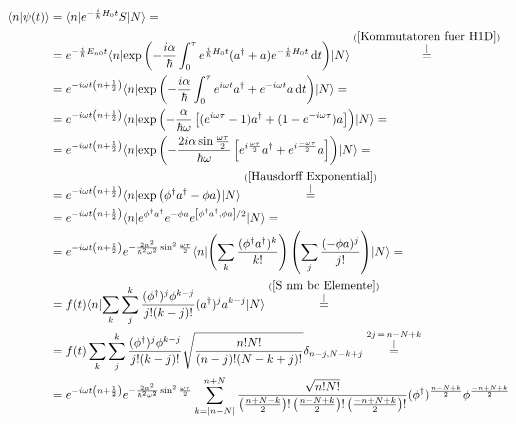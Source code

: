 \documentclass[a4paper,12pt]{article}
\newcommand{\kom}{}
\newcommand{\brak}{}
\newcommand{\braket}{}
\newcommand{\intx}{}
\newcommand{\kla}{}
\newcommand{\klam}{}
\begin{document}
\begin{align*}
\brak\langle {n}| {\psi(t)}\rangle&=\braket\langle {n} | e^{ -\frac{i}{\hbar}H_0t}S | {N}\rangle=\\
&=e^{-\frac{i}{\hbar}E_{n0}t}\braket\langle {n} | {\exp\kla\left( {-\frac{i\alpha}{\hbar}\intx\int_{0}^{\tau}e^{\frac{i}{\hbar}H_0t}(a^\dagger +a)e^{-\frac{i}{\hbar}H_0t}\,\mathrm{d}t} \right)} | {N}\rangle\kom\overset{\substack{{(\ref{Kommutatoren fuer H1D})} \\ |}}{=}\\
&=e^{-i\omega t\kla\left( {n+\frac{1}{2}} \right)}\braket\langle {n} | {\exp\kla\left( {-\frac{i\alpha}{\hbar}\intx\int_{0}^{\tau}e^{i\omega t}a^\dagger +e^{-i\omega t}a\,\mathrm{d}t} \right)} | {N}\rangle=\\
&=e^{-i\omega t\kla\left( {n+\frac{1}{2}} \right)}\braket\langle {n} | {\exp\kla\left( {-\frac{\alpha}{\hbar\omega}\klam\left[ {(e^{i\omega\tau}-1)a^\dagger + (1-e^{-i\omega\tau})a} \right]} \right)} | {N}\rangle=\\
&=e^{-i\omega t\kla\left( {n+\frac{1}{2}} \right)}\braket\langle {n} | {\exp\kla\left( {-\frac{2i\alpha\sin\frac{\omega\tau}{2}}{\hbar\omega}\klam\left[ {e^{i\frac{\omega\tau}{2}}a^\dagger + e^{i\frac{-\omega\tau}{2}}a} \right]} \right)} | {N}\rangle=\\
&=e^{-i\omega t\kla\left( {n+\frac{1}{2}} \right)}\braket\langle {n} | {\exp\kla\left( {\phi^\dagger a^\dagger-\phi a} \right)} | {N}\rangle\kom\overset{\substack{{(\ref{Hausdorff Exponential})} \\ |}}{=}\\
&=e^{-i\omega t\kla\left( {n+\frac{1}{2}} \right)}\braket\langle {n} | {e^{\phi^\dagger a^\dagger}e^{-\phi a}e^{\klam\left[ {\phi^\dagger a^\dagger,\phi a} \right]/2}} | {N}\rangle=\\
&=e^{-i\omega t\kla\left( {n+\frac{1}{2}} \right)}e^{-\frac{2\alpha^2}{\hbar^2\omega^2}\sin^2\frac{\omega\tau}{2}}\braket\langle {n} | {\kla\left( {\sum_k\frac{(\phi^\dagger a^\dagger)^k}{k!}} \right)\kla\left( {\sum_j\frac{(-\phi a)^j}{j!}} \right)} | {N}\rangle=\\
&=f(t)\braket\langle {n} | {\sum_k\sum_j^k\frac{(\phi^\dagger)^j\phi^{k-j}}{j!(k-j)!}(a^\dagger)^ja^{k-j}} | {N}\rangle\kom\overset{\substack{{(\ref{S nm bc Elemente})} \\ |}}{=}\\
&=f(t)\sum_k\sum_j^k\frac{(\phi^\dagger)^j\phi^{k-j}}{j!(k-j)!}\sqrt{\frac{n!N!}{(n-j)!(N-k+j)!}}\delta_{n-j,N-k+j}\kom\overset{\substack{{2j\,=\,n-N+k} \\ |}}{=}\\
&=e^{-i\omega t\kla\left( {n+\frac{1}{2}} \right)}e^{-\frac{2\alpha^2}{\hbar^2\omega^2}\sin^2\frac{\omega\tau}{2}}\sum_{k=|n-N|}^{n+N}\frac{\sqrt{n!N!}}{\kla\left( {\frac{n+N-k}{2}} \right)!\kla\left( {\frac{n-N+k}{2}} \right)!\kla\left( {\frac{-n+N+k}{2}} \right)!}(\phi^\dagger)^{\frac{n-N+k}{2}}\phi^{\frac{-n+N+k}{2}}
\end{align*}
\end{document}
